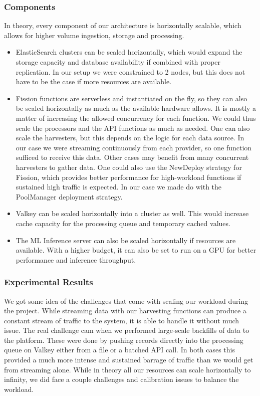 \subsubsection{Components}
In theory, every component of our architecture is horizontally scalable, which allows for higher volume ingestion, storage and processing. 
\begin{itemize}
	\item ElasticSearch clusters can be scaled horizontally, which would expand the storage capacity and database availability if combined with proper replication. In our setup we were constrained to 2 nodes, but this does not have to be the case if more resources are available.
	
	\item Fission functions are serverless and instantiated on the fly, so they can also be scaled horizontally as much as the available hardware allows. It is mostly a matter of increasing the allowed concurrency for each function.  We could thus scale the processors and the API functions as much as needed. One can also scale the harvesters, but this depends on the logic for each data source. In our case we were streaming continuously from each provider, so one function sufficed to receive this data. Other cases may benefit from many concurrent harvesters to gather data. One could also use the NewDeploy strategy for Fission, which provides better performance for high-workload functions if sustained high traffic is expected. In our case we made do with the PoolManager deployment strategy.
	
	\item Valkey can be scaled horizontally into a cluster as well. This would increase cache capacity for the processing queue and temporary cached values.
	
	\item The ML Inference server can also be scaled horizontally if resources are available. With a higher budget, it can also be set to run on a GPU for better performance and inference throughput.
\end{itemize}

\subsubsection{Experimental Results}
We got some idea of the challenges that come with scaling our workload during the project. While streaming data with our harvesting functions can produce a constant stream of traffic to the system, it is able to handle it without much issue. The real challenge cam when we performed large-scale backfills of data to the platform. These were done by pushing records directly into the processing queue on Valkey either from a file or a batched API call. In both cases this provided a much more intense and sustained barrage of traffic than we would get from streaming alone. While in theory all our resources can scale horizontally to infinity, we did face a couple challenges and calibration issues to balance the workload.
\\

